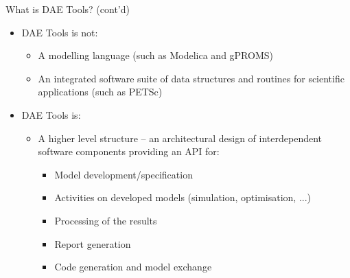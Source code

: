 \documentclass[compress,newPxFont,sthlmFooter]{beamer}
\begin{document}
\begin{frame}{What is DAE Tools? (cont'd)} 
  \begin{itemize}
    \item DAE Tools \alert{is not}:
        \begin{itemize}
            \item A modelling language (such as Modelica and gPROMS)
            \item An integrated software suite of data structures and routines for scientific applications (such as PETSc)
        \end{itemize}
    \item DAE Tools \alert{is}:
        \begin{itemize}
            \item A higher level structure – an architectural design of interdependent software components
                  providing an API for:
                \begin{itemize}
                    \item Model development/specification
                    \item Activities on developed models (simulation, optimisation, ...)
                    \item Processing of the results
                    \item Report generation
                    \item Code generation and model exchange
                \end{itemize}
        \end{itemize}
  \end{itemize}
\end{frame}
\end{document}
